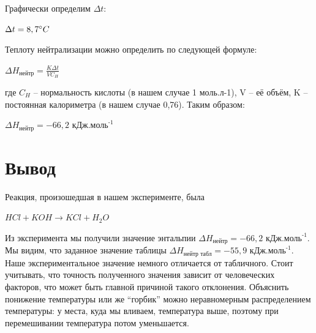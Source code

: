 \documentclass[a4paper, 12pt]{article}%
\begin{document}
 Графически определим $\Delta t$:
\begin{center}
$\Delta t = 8,7 \degree C$
\end{center}
Теплоту нейтрализации можно определить по следующей формуле:
\begin{center}
$ \Delta H_{\text {нейтр}} = \frac{K \Delta t}{V C_H}$
\end{center}
где $C_H$ – нормальность кислоты (в нашем случае 1 моль.л-1), V – её объём, K – постоянная калориметра (в нашем случае 0,76). 
Таким образом:
\begin{center}
$ \Delta H_{\text {нейтр}} = -66,2$  $\text{кДж.моль}^\text{-1}$
\end{center}
\newpage
\section{Вывод}
Реакция, произошедшая в нашем эксперименте, была
\begin{center}
$HCl + KOH \rightarrow KCl + H_2O$
\end{center}
Из эксперимента мы получили значение энтальпии $ \Delta H_{\text {нейтр}} = -66,2$  $\text{кДж.моль}^\text{-1}$. Мы видим, что заданное значение таблицы $ \Delta H_{\text {нейтр табл}} = -55,9$  $\text{кДж.моль}^\text{-1}$. Наше экспериментальное значение немного отличается от табличного. Стоит учитывать, что точность полученного значения зависит от человеческих факторов, что может быть главной причиной такого отклонения. Объяснить понижение температуры или же “горбик” можно неравномерным распределением температуры: у места, куда мы вливаем, температура выше, поэтому при перемешивании температура потом уменьшается.  
\end{document}
